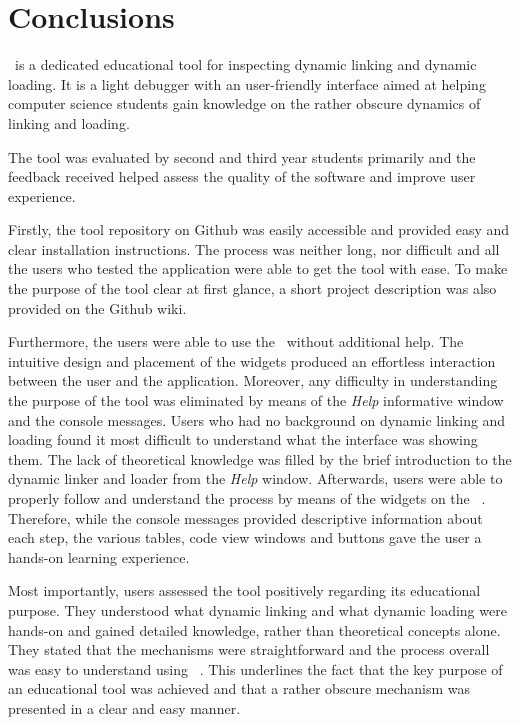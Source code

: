 \section{Conclusions}
\label{sec:conclusions}

\project\ is a dedicated educational tool for inspecting dynamic linking and dynamic loading. It is a light debugger with an user-friendly interface aimed at helping computer science students gain knowledge on the rather obscure dynamics of linking and loading.

The tool was evaluated by second and third year students primarily and the feedback received helped assess the quality of the software and improve user experience.

Firstly, the tool repository on Github was easily accessible and provided easy and clear installation instructions. The process was neither long, nor difficult and all the users who tested the application were able to get the tool with ease. To make the purpose of the tool clear at first glance, a short project description was also provided on the Github wiki.

Furthermore, the users were able to use the \gui\ without additional help. The intuitive design and placement of the widgets produced an effortless interaction between the user and the application. Moreover, any difficulty in understanding the purpose of the tool was eliminated by means of the \textit{Help} informative window and the console messages. Users who had no background on dynamic linking and loading found it most difficult to understand what the interface was showing them. The lack of theoretical knowledge was filled by the brief introduction to the dynamic linker and loader from the \textit{Help} window. Afterwards, users were able to properly follow and understand the process by means of the widgets on the \gui\ . Therefore, while the console messages provided descriptive information about each step, the various tables, code view windows and buttons gave the user a hands-on learning experience.

Most importantly, users assessed the tool positively regarding its educational purpose. They understood what dynamic linking and what dynamic loading were hands-on and gained detailed knowledge, rather than theoretical concepts alone. They stated that the mechanisms were straightforward and the process overall was easy to understand using \project\ . This underlines the fact that the key purpose of an educational tool was achieved and that a rather obscure mechanism was presented in a clear and easy manner.